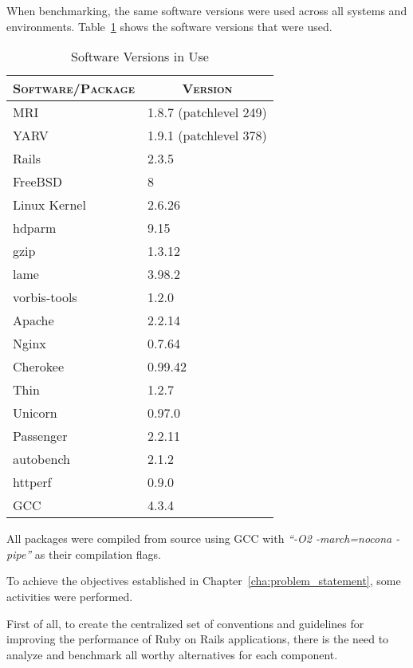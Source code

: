 When benchmarking, the same software versions were used across all systems and environments. Table~\ref{tab:software_versions} shows the software versions that were used.
\begin{table}[ht]
  \centering
  \caption{Software Versions in Use}
  \label{tab:software_versions}
  
  \begin{tabular}{p{}|p{}}
    \multicolumn{1}{c|}{\textbf{\textsc{Software/Package}}} & \multicolumn{1}{c}{\textbf{\textsc{Version}}} \\ \hline
    
    MRI & 1.8.7 (patchlevel 249) \\ \hline
    YARV & 1.9.1 (patchlevel 378) \\ \hline
    Rails & 2.3.5 \\ \hline
    FreeBSD & 8 \\ \hline
    Linux Kernel & 2.6.26 \\ \hline
    hdparm & 9.15 \\ \hline
    gzip & 1.3.12 \\ \hline
    lame & 3.98.2 \\ \hline
    vorbis-tools & 1.2.0 \\ \hline
    Apache & 2.2.14 \\ \hline
    Nginx & 0.7.64 \\ \hline
    Cherokee & 0.99.42 \\ \hline
    Thin & 1.2.7 \\ \hline
    Unicorn & 0.97.0 \\ \hline
    Passenger & 2.2.11 \\ \hline
    autobench & 2.1.2 \\ \hline
    httperf & 0.9.0 \\ \hline
    GCC & 4.3.4 \\
        
  \end{tabular}
\end{table}
All packages were compiled from source using GCC with \textit{``-O2 -march=nocona -pipe''} as their compilation flags.

To achieve the objectives established in Chapter~\ref{cha:problem_statement}, some activities were performed.

First of all, to create the centralized set of conventions and guidelines for improving the performance of Ruby on Rails applications, there is the need to analyze and benchmark all worthy alternatives for each component.

